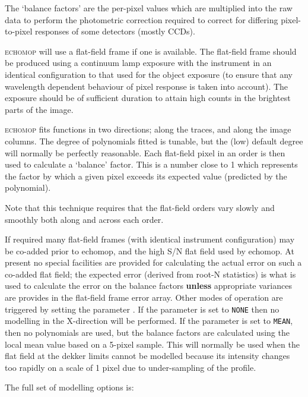\documentclass[twoside,11pt,nolof]{starlink}
\newcommand{\myindex}[1]{\index{#1}}
\newcommand{\indexcmdname}[1]{\index{\begingroup \catcode`\_=12 \texttt{#1} \endgroup}}
\begin{document}
The `balance factors' are the per-pixel values which are multiplied into
the raw data to perform the photometric correction required to correct for
differing pixel-to-pixel responses of some detectors (mostly CCDs).

\textsc{echomop} will use a flat-field frame if one is available. The flat-field
frame should  be produced using a continuum lamp exposure with the
instrument in an identical configuration to that used for the object
exposure (to ensure that any wavelength dependent behaviour of pixel
response is taken into account). The exposure should be of sufficient
duration to attain high counts in the brightest parts of the image.

\textsc{echomop} fits functions in two directions; along the traces, and along the
image columns. The degree of polynomials fitted is tunable, but the
(low) default degree will normally be perfectly reasonable. Each flat-field
pixel in an order is then used to calculate a `balance' factor. This is a
number close to 1 which represents the factor by which a given pixel
exceeds its expected value (predicted by the polynomial).

Note that this technique requires that the flat-field orders vary slowly
and smoothly both along and across each order.

If required many flat-field frames (with identical instrument
configuration) may be co-added prior to {\sc echomop,} and the high S/N flat field
used by {\sc echomop.} At present no special facilities are provided for
calculating the actual error on such a co-added flat field; the expected
error (derived from root-N statistics) is what is used to calculate the
error on the balance factors {\bf unless} appropriate
variances are provides in the flat-field frame error array.
\myindex{Errors!on flat field}
\indexcmdname{FLTFIT}
Other modes of operation are triggered by setting the parameter
\@.
If the parameter is set to \texttt{NONE} then no modelling in
the X-direction will be performed. If the parameter is set to \texttt{MEAN},
then no polynomials are  used, but the balance factors are calculated
using the local mean value based  on a 5-pixel sample. This will normally
be used when the flat field at the dekker limits cannot be modelled because
its intensity changes too rapidly on a scale of 1 pixel due to
under-sampling of the profile.

The full set of modelling options is:
\end{document}

